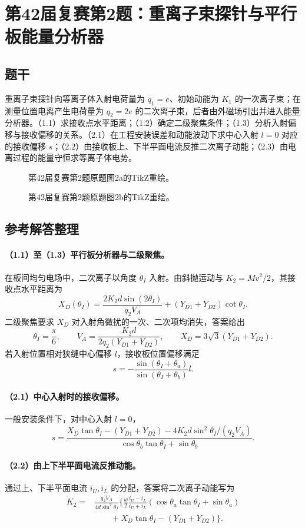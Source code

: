 \section{第42届复赛第2题：重离子束探针与平行板能量分析器}
\subsection{题干}
重离子束探针向等离子体入射电荷量为 $q_1=e$、初始动能为 $K_1$ 的一次离子束；在测量位置电离产生电荷量为 $q_2=2e$ 的二次离子束，后者由外磁场引出并进入能量分析器。（1.1）求接收点水平距离；（1.2）确定二级聚焦条件；（1.3）分析入射偏移与接收偏移的关系。（2.1）在工程安装误差和动能波动下求中心入射 $l=0$ 对应的接收偏移 $s$；（2.2）由接收板上、下半平面电流反推二次离子动能；（2.3）由电离过程的能量守恒求等离子体电势。
\begin{figure}[htbp]\centering\caption{第42届复赛第2题原题图2a的TikZ重绘。}\end{figure}
\begin{figure}[htbp]\centering\caption{第42届复赛第2题原题图2b的TikZ重绘。}\end{figure}
\subsection{参考解答整理}
\paragraph{（1.1）至（1.3）平行板分析器与二级聚焦。}
在板间均匀电场中，二次离子以角度 $\theta_I$ 入射。由斜抛运动与 $K_2=Mv^2/2$，其接收点水平距离为
\[X_D(\theta_I)=\frac{2K_2d\sin(2\theta_I)}{q_2V_A}+(Y_{D1}+Y_{D2})\cot\theta_I.\]
二级聚焦要求 $X_D$ 对入射角微扰的一次、二次项均消失，答案给出
\[\theta_I=\frac\pi6,\qquad V_A=\frac{K_2d}{2q_2(Y_{D1}+Y_{D2})},\qquad X_D=3\sqrt3(Y_{D1}+Y_{D2}).\]
若入射位置相对狭缝中心偏移 $l$，接收板位置偏移满足
\[s=-\frac{\sin(\theta_I+\theta_a)}{\sin(\theta_I+\theta_b)}l.\]
\paragraph{（2.1）中心入射时的接收偏移。}
一般安装条件下，对中心入射 $l=0$，
\[s=\frac{X_D\tan\theta_I-(Y_{D1}+Y_{D2})-4K_2d\sin^2\theta_I/(q_2V_A)}{\cos\theta_b\tan\theta_I+\sin\theta_b}.\]
\paragraph{（2.2）由上下半平面电流反推动能。}
通过上、下半平面电流 $i_U,i_L$ 的分配，答案将二次离子动能写为
\[\begin{aligned}
K_2={}&\frac{q_2V_A}{4d\sin^2\theta_I}\biggl\{\frac w2\frac{i_U-i_L}{i_U+i_L}(\cos\theta_a\tan\theta_I+\sin\theta_a)\\
&\qquad+X_D\tan\theta_I-(Y_{D1}+Y_{D2})\biggr\}.
\end{aligned}\]
